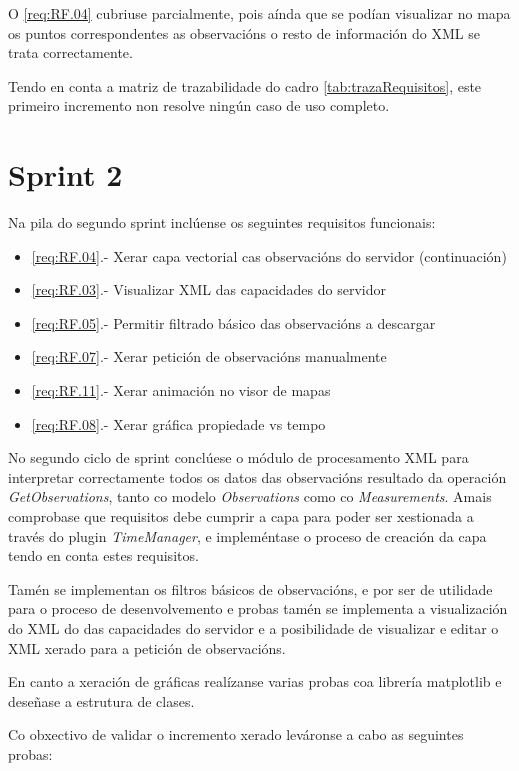 O \ref{req:RF.04} cubriuse parcialmente, pois aínda que se podían visualizar no mapa os puntos correspondentes as observacións o resto de información do XML se trata correctamente.

Tendo en conta a matriz de trazabilidade do cadro \ref{tab:trazaRequisitos}, este primeiro incremento non resolve ningún caso de uso completo.

\section{Sprint 2}
Na pila do segundo sprint inclúense os seguintes requisitos funcionais:
\begin{itemize}
\item \ref{req:RF.04}.- Xerar capa vectorial cas observacións do servidor (continuación)
\item \ref{req:RF.03}.- Visualizar XML das capacidades do servidor
\item \ref{req:RF.05}.- Permitir filtrado básico das observacións a descargar
\item \ref{req:RF.07}.- Xerar petición de observacións manualmente
\item \ref{req:RF.11}.- Xerar animación no visor de mapas
\item \ref{req:RF.08}.- Xerar gráfica propiedade vs tempo
\end{itemize}

No segundo ciclo de sprint conclúese o módulo de procesamento XML para interpretar correctamente todos os datos das observacións resultado da operación \emph{GetObservations}, tanto co modelo \emph{Observations} como co \emph{Measurements}. Amais comprobase que requisitos debe cumprir a capa para poder ser xestionada a través do plugin \emph{TimeManager}, e impleméntase o proceso de creación da capa tendo en conta estes requisitos.

Tamén se implementan os filtros básicos de observacións, e por ser de utilidade para o proceso de desenvolvemento e probas tamén se implementa a visualización do XML do das capacidades do servidor e a posibilidade de visualizar e editar o XML xerado para a petición de observacións.

En canto a xeración de gráficas realízanse varias probas coa librería matplotlib e deseñase a estrutura de clases.

Co obxectivo de validar o incremento xerado leváronse a cabo as seguintes probas:

